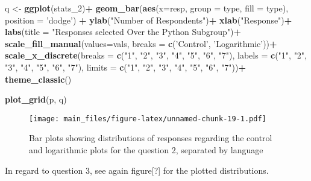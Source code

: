 \documentclass[
]{article}
\newenvironment{Shaded}{\begin{snugshade}}{\end{snugshade}}
\newcommand{\DataTypeTok}[1]{\textcolor[rgb]{0.13,0.29,0.53}{#1}}
\newcommand{\DecValTok}[1]{\textcolor[rgb]{0.00,0.00,0.81}{#1}}
\newcommand{\KeywordTok}[1]{\textcolor[rgb]{0.13,0.29,0.53}{\textbf{#1}}}
\newcommand{\NormalTok}[1]{#1}
\newcommand{\OperatorTok}[1]{\textcolor[rgb]{0.81,0.36,0.00}{\textbf{#1}}}
\newcommand{\StringTok}[1]{\textcolor[rgb]{0.31,0.60,0.02}{#1}}
\begin{document}
\begin{Shaded}
\begin{Highlighting}[]
\NormalTok{q <-}\StringTok{ }\KeywordTok{ggplot}\NormalTok{(stats_}\DecValTok{2}\NormalTok{)}\OperatorTok{+}
\StringTok{  }\KeywordTok{geom_bar}\NormalTok{(}\KeywordTok{aes}\NormalTok{(}\DataTypeTok{x=}\NormalTok{resp, }\DataTypeTok{group =}\NormalTok{ type, }\DataTypeTok{fill =}\NormalTok{ type), }\DataTypeTok{position =} \StringTok{'dodge'}\NormalTok{) }\OperatorTok{+}
\StringTok{  }\KeywordTok{ylab}\NormalTok{(}\StringTok{"Number of Respondents"}\NormalTok{)}\OperatorTok{+}
\StringTok{  }\KeywordTok{xlab}\NormalTok{(}\StringTok{"Response"}\NormalTok{)}\OperatorTok{+}
\StringTok{  }\KeywordTok{labs}\NormalTok{(}\DataTypeTok{title =} \StringTok{"Responses selected Over the Python Subgroup"}\NormalTok{)}\OperatorTok{+}
\StringTok{  }\KeywordTok{scale_fill_manual}\NormalTok{(}\DataTypeTok{values=}\NormalTok{vals, }\DataTypeTok{breaks =} \KeywordTok{c}\NormalTok{(}\StringTok{'Control'}\NormalTok{, }\StringTok{'Logarithmic'}\NormalTok{))}\OperatorTok{+}
\StringTok{  }\KeywordTok{scale_x_discrete}\NormalTok{(}\DataTypeTok{breaks =} \KeywordTok{c}\NormalTok{(}\StringTok{"1"}\NormalTok{, }\StringTok{"2"}\NormalTok{, }\StringTok{"3"}\NormalTok{, }\StringTok{"4"}\NormalTok{, }\StringTok{"5"}\NormalTok{, }\StringTok{"6"}\NormalTok{, }\StringTok{"7"}\NormalTok{), }\DataTypeTok{labels =} \KeywordTok{c}\NormalTok{(}\StringTok{"1"}\NormalTok{, }\StringTok{"2"}\NormalTok{, }\StringTok{"3"}\NormalTok{, }\StringTok{"4"}\NormalTok{, }\StringTok{"5"}\NormalTok{, }\StringTok{"6"}\NormalTok{, }\StringTok{"7"}\NormalTok{), }\DataTypeTok{limits =} \KeywordTok{c}\NormalTok{(}\StringTok{"1"}\NormalTok{, }\StringTok{"2"}\NormalTok{, }\StringTok{"3"}\NormalTok{, }\StringTok{"4"}\NormalTok{, }\StringTok{"5"}\NormalTok{, }\StringTok{"6"}\NormalTok{, }\StringTok{"7"}\NormalTok{))}\OperatorTok{+}
\StringTok{  }\KeywordTok{theme_classic}\NormalTok{()}

\KeywordTok{plot_grid}\NormalTok{(p, q)}
\end{Highlighting}
\end{Shaded}

\begin{figure}
\centering
\texttt{[image: main\_files/figure-latex/unnamed-chunk-19-1.pdf]}
\caption{Bar plots showing distributions of responses regarding the
control and logarithmic plots for the question 2, separated by language}
\end{figure}

In regard to question 3, see again figure{[}?{]} for the plotted
distributions.
\end{document}
